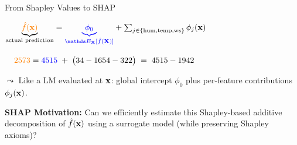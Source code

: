 \documentclass[10pt,compress,t,notes=noshow, xcolor=table]{beamer}
\begin{document}
\begin{frame}{From Shapley Values to SHAP}
\medskip

\centerline{$
\underbrace{{\color{orange} \fh(\xv)}}_{\text{actual prediction}}
={\color{blue} \underbrace{\phi_0}_{\E_{\mathbf X}[\fh(\mathbf X)]}}
+\sum_{j\in\{\text{hum},\text{temp},\text{ws}\}}\phi_j(\xv)
$}
\medskip
\centerline{$
\phantom{=} \; {\color{orange} 2573}
= {\color{blue} 4515}
\;+\;
\bigl(34 -1654 - 322\bigr)
\;=\;4515-1942
$}
\medskip

\(\leadsto\) Like a LM evaluated at \(\mathbf{x}\): global intercept \(\phi_0\) plus per-feature contributions \(\phi_j(\mathbf{x})\).

\medskip



\textbf{SHAP Motivation:}
Can we efficiently estimate this Shapley-based additive decomposition of $\hat{f}(\mathbf{x})$ using a surrogate model (while preserving Shapley axioms)?

\end{frame}
\end{document}
